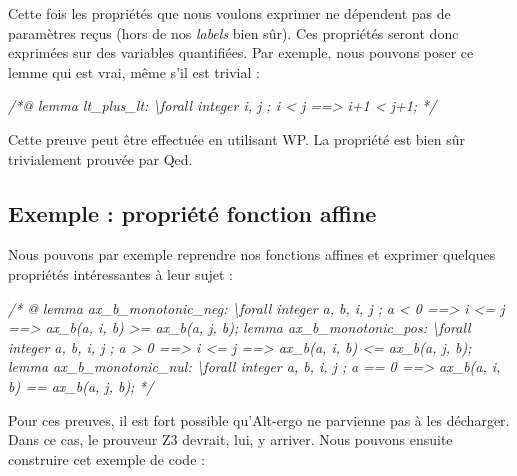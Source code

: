 \documentclass[12pt,francais,]{scrbook}
\newenvironment{Shaded}{}{}
\newcommand{\CommentTok}[1]{\textcolor[rgb]{0.38,0.63,0.69}{\textit{{#1}}}}
\begin{document}
Cette fois les propriétés que nous voulons exprimer ne dépendent pas de
paramètres reçus (hors de nos \emph{labels} bien sûr). Ces propriétés
seront donc exprimées sur des variables quantifiées. Par exemple, nous
pouvons poser ce lemme qui est vrai, même s'il est trivial :

\begin{footnotesize}\begin{Shaded}
\begin{Highlighting}[]
\CommentTok{/*@}
\CommentTok{  lemma lt_plus_lt:}
\CommentTok{    \textbackslash{}forall integer i, j ; i < j ==> i+1 < j+1;}
\CommentTok{*/}
\end{Highlighting}
\end{Shaded}\end{footnotesize}

Cette preuve peut être effectuée en utilisant WP. La propriété est bien
sûr trivialement prouvée par Qed.

\subsection{Exemple : propriété fonction
affine}\label{exemple-propriuxe9tuxe9-fonction-affine}

Nous pouvons par exemple reprendre nos fonctions affines et exprimer
quelques propriétés intéressantes à leur sujet :

\begin{footnotesize}\begin{Shaded}
\begin{Highlighting}[]
\CommentTok{/* @}
\CommentTok{  lemma ax_b_monotonic_neg:}
\CommentTok{    \textbackslash{}forall integer a, b, i, j ;}
\CommentTok{      a <  0 ==> i <= j ==> ax_b(a, i, b) >= ax_b(a, j, b);}
\CommentTok{  lemma ax_b_monotonic_pos:}
\CommentTok{    \textbackslash{}forall integer a, b, i, j ;}
\CommentTok{      a >  0 ==> i <= j ==> ax_b(a, i, b) <= ax_b(a, j, b);}
\CommentTok{  lemma ax_b_monotonic_nul:}
\CommentTok{    \textbackslash{}forall integer a, b, i, j ;}
\CommentTok{      a == 0 ==> ax_b(a, i, b) == ax_b(a, j, b);}
\CommentTok{*/}
\end{Highlighting}
\end{Shaded}\end{footnotesize}

Pour ces preuves, il est fort possible qu'Alt-ergo ne parvienne pas à
les décharger. Dans ce cas, le prouveur Z3 devrait, lui, y arriver. Nous
pouvons ensuite construire cet exemple de code :
\end{document}
